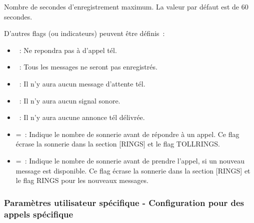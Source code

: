 \begin{description}

    Nombre de secondes d'enregistrement maximum. La valeur par défaut est de 60 secondes.



    D'autres flags (ou indicateurs) peuvent être définis~:
    \begin{itemize}
        \item {}~: Ne repondra pas à d'appel tél.
        \item {}~: Tous les messages ne seront pas enregistrés.
        \item {}~: Il n'y aura aucun message d'attente tél.
        \item {}~: Il n'y aura aucun signal sonore.
        \item {}~: Il n'y aura aucune annonce tél délivrée.
        \item {}=~: Indique le nombre de sonnerie avant de répondre à un appel.
            Ce flag écrase la sonnerie dans la section [RINGS] et le flag TOLLRINGS.
        \item {}=~: Indique le nombre de sonnerie avant de prendre l'appel,
			si un nouveau message est disponible. Ce flag écrase la sonnerie dans la section
			[RINGS] et le flag RINGS pour les nouveaux messages.
    \end{itemize}
\end{description}

\subsubsection{Paramètres utilisateur spécifique - Configuration pour des appels spécifique}

